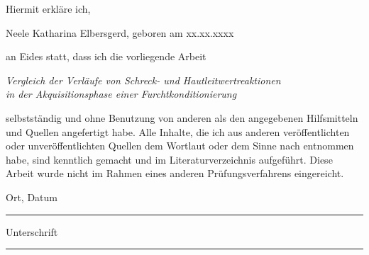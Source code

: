 \noindent 
Hiermit erkläre ich,
		\begin{center}
			Neele Katharina Elbersgerd, geboren am xx.xx.xxxx 
		\end{center} 
\noindent 
an Eides statt, dass ich die vorliegende Arbeit 
		\begin{center}
			\textit{Vergleich der Verläufe von Schreck- und Hautleitwertreaktionen \\in der Akquisitionsphase einer Furchtkonditionierung}
		\end{center}
\noindent 
selbstständig und ohne Benutzung von anderen als den angegebenen Hilfsmitteln und Quellen angefertigt habe. Alle Inhalte, die ich aus anderen veröffentlichten oder unveröffentlichten Quellen dem Wortlaut oder dem Sinne nach entnommen habe, sind kenntlich gemacht und im Literaturverzeichnis aufgeführt. Diese Arbeit wurde nicht im Rahmen eines anderen Prüfungsverfahrens eingereicht.
\newline
\vspace*{1cm}

\noindent Ort, Datum\\
\rule[0.5em]{30em}{0.5pt} %

\vspace*{0.5cm}
\noindent Unterschrift\\
\rule[0.5em]{30em}{0.5pt} %